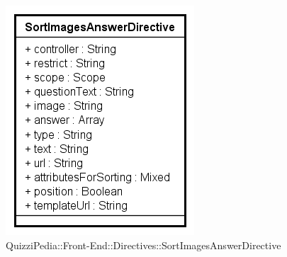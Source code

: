 		\begin{figure}[ht]
			\centering
			\includegraphics[scale=0.80,keepaspectratio]{UML/Classi/Front-End/QuizziPedia_Front-end_Templates_SortImagesAnswerTemplate.png}
			\caption{QuizziPedia::Front-End::Directives::SortImagesAnswerDirective}
		\end{figure} \FloatBarrier
		
